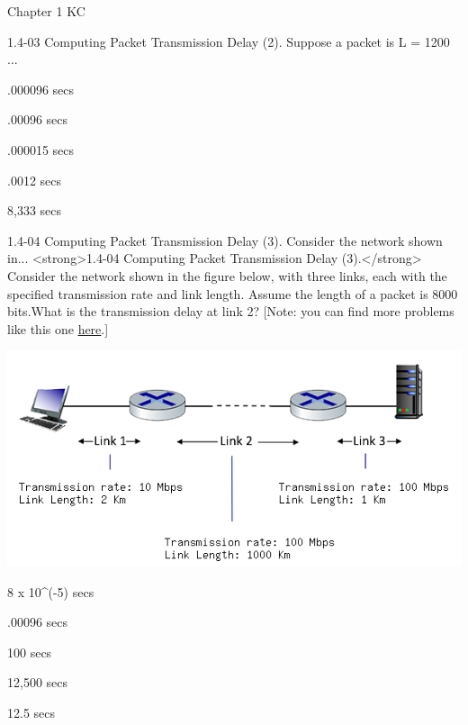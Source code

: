 \documentclass[a4paper]{article}
\begin{document}
\begin{quiz}{Chapter 1 KC}
\begin{multi}[points=1]{1.4-03 Computing Packet Transmission Delay (2). Suppose a packet is L = 1200 ...}
\item* .000096 secs
\item .00096 secs
\item .000015 secs
\item .0012 secs
\item 8,333 secs
\end{multi}

\begin{multi}[points=1]{1.4-04 Computing Packet Transmission Delay (3). Consider the network shown in...}
<strong>1.4-04 Computing Packet Transmission Delay (3).</strong> Consider the network shown in the figure below, with three links, each with the specified transmission rate and link length. Assume the length of a packet is 8000 bits.What is the transmission delay at link 2?  [Note: you can find more problems like this one \href{http://gaia.cs.umass.edu/kurose_ross/interactive/one-hop-delay.php}{here}.] 
\begin{center}
\includegraphics[width=\linewidth]{figs/1.4.4.png}
\end{center}

\item* 8 x 10^(-5) secs
\item .00096 secs
\item 100 secs
\item 12,500 secs
\item 12.5 secs
\end{multi}


\end{quiz}
\end{document}
